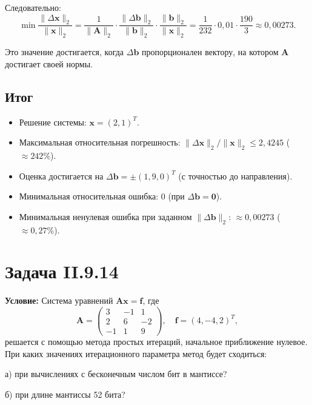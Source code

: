 \documentclass{article}
\begin{document}
Следовательно:
\begin{equation}
\min \frac{\|\Delta\mathbf{x}\|_2}{\|\mathbf{x}\|_2} = \frac{1}{\|\mathbf{A}\|_2} \cdot \frac{\|\Delta\mathbf{b}\|_2}{\|\mathbf{b}\|_2} \cdot \frac{\|\mathbf{b}\|_2}{\|\mathbf{x}\|_2} = \frac{1}{232} \cdot 0{,}01 \cdot \frac{190}{3} \approx 0{,}00273.
\end{equation}

Это значение достигается, когда $\Delta\mathbf{b}$ пропорционален вектору, на котором $\mathbf{A}$ достигает своей нормы.

\subsection*{Итог}

\begin{itemize}
\item Решение системы: $\mathbf{x} = (2, 1)^T$.
\item Максимальная относительная погрешность: $\|\Delta\mathbf{x}\|_2/\|\mathbf{x}\|_2 \leqslant 2{,}4245$ ($\approx 242\%$).
\item Оценка достигается на $\Delta\mathbf{b} = \pm(1{,}9, 0)^T$ (с точностью до направления).
\item Минимальная относительная ошибка: $0$ (при $\Delta\mathbf{b} = \mathbf{0}$).
\item Минимальная ненулевая ошибка при заданном $\|\Delta\mathbf{b}\|_2$: $\approx 0{,}00273$ ($\approx 0{,}27\%$).
\end{itemize}



\section*{Задача II.9.14}

\textbf{Условие:} Система уравнений $\mathbf{A}\mathbf{x} = \mathbf{f}$, где
$$\mathbf{A} = \begin{pmatrix} 3 & -1 & 1 \\ 2 & 6 & -2 \\ -1 & 1 & 9 \end{pmatrix}, \quad \mathbf{f} = (4, -4, 2)^T,$$
решается с помощью метода простых итераций, начальное приближение нулевое. При каких значениях итерационного параметра метод будет сходиться:

а) при вычислениях с бесконечным числом бит в мантиссе?

б) при длине мантиссы 52 бита?
\end{document}
